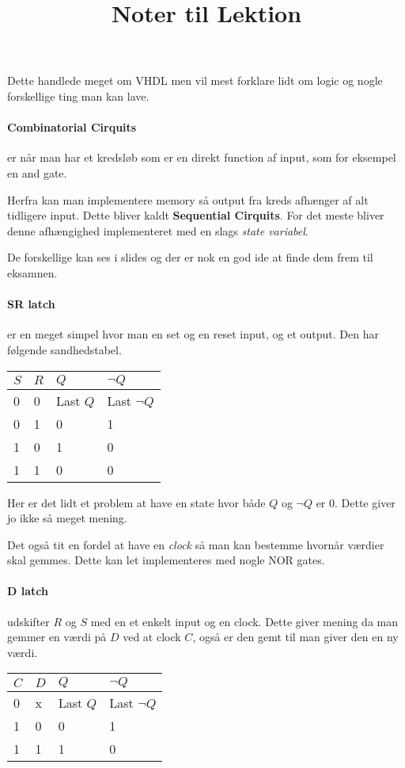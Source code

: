 \title{Noter til Lektion}

Dette handlede meget om VHDL men vil mest forklare lidt om logic og nogle forskellige ting man kan lave.

\paragraph{Combinatorial Cirquits} er når man har et kredsløb som er en direkt function af input, som for eksempel en and gate.

Herfra kan man implementere memory så output fra kreds afhænger af alt tidligere input.
Dette bliver kaldt \textbf{Sequential Cirquits}.
For det meste bliver denne afhængighed implementeret med en slags \emph{state variabel}.

De forskellige kan ses i slides og der er nok en god ide at finde dem frem til eksamnen.

\paragraph{SR latch} er en meget simpel hvor man en set og en reset input, og et output.
Den har følgende sandhedstabel.

\begin{tabular}{ll|ll} \toprule
    $S$ & $R$ & $Q$ & $\neg Q$ \\ \midrule
    0 & 0 & Last $Q$ & Last $\neg Q$ \\
    0 & 1 & 0 & 1 \\
    1 & 0 & 1 & 0 \\
    1 & 1 & 0 & 0 \\ \bottomrule
\end{tabular}

Her er det lidt et problem at have en state hvor både $Q$ og $\neg Q$ er 0.
Dette giver jo ikke så meget mening.

Det også tit en fordel at have en \emph{clock} så man kan bestemme hvornår værdier skal gemmes.
Dette kan let implementeres med nogle NOR gates.

\paragraph{D latch} udskifter $R$ og $S$ med en et enkelt input og en clock.
Dette giver mening da man gemmer en værdi på $D$ ved at clock $C$, også er den gemt til man giver den en ny værdi.

\begin{tabular}{ll|ll} \toprule
    $C$ & $D$ & $Q$ & $\neg Q$ \\ \midrule
    0 & x & Last $Q$ & Last $\neg Q$ \\
    1 & 0 & 0 & 1 \\
    1 & 1 & 1 & 0 \\ \bottomrule
\end{tabular}

